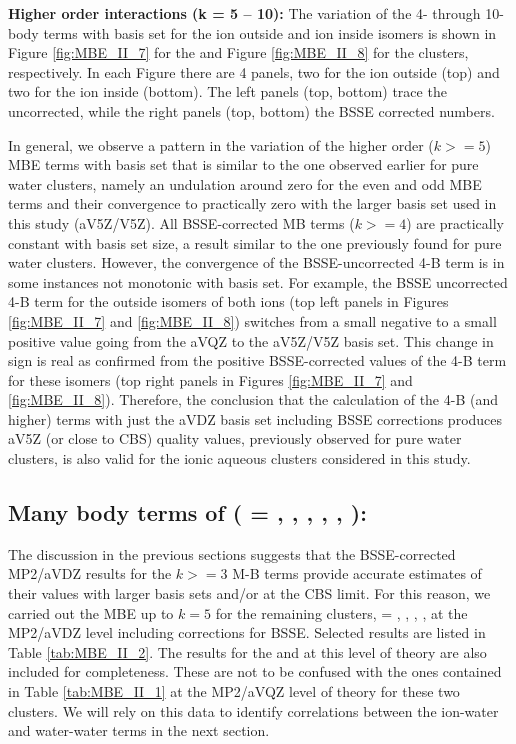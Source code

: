 \documentclass[11pt, proquest]{uwthesis}[2020/02/24]
\let\ce\ch
\begin{document}
\textbf{Higher order interactions (k = 5 – 10):} The variation of the 4- through 10-body terms with basis set for the ion outside and ion inside isomers is shown in Figure \ref{fig:MBE_II_7} for the \ce{Li^+(H2O)9} and Figure \ref{fig:MBE_II_8} for the \ce{Cl^-(H2O)9} clusters, respectively. In each Figure there are 4 panels, two for the ion outside (top) and two for the ion inside (bottom). The left panels (top, bottom) trace the uncorrected, while the right panels (top, bottom) the BSSE corrected numbers.

\par In general, we observe a pattern in the variation of the higher order ($k >= 5$) MBE terms with basis set that is similar to the one observed earlier for pure water clusters,\autocite{heindel_many-body_2020} namely an undulation around zero for the even and odd MBE terms and their convergence to practically zero with the larger basis set used in this study (aV5Z/V5Z). All BSSE-corrected MB terms ($k >= 4$) are practically constant with basis set size, a result similar to the one previously found for pure water clusters.\autocite{heindel_many-body_2020} However, the convergence of the BSSE-uncorrected 4-B term is in some instances not monotonic with basis set. For example, the BSSE uncorrected 4-B term for the outside isomers of both ions (top left panels in Figures \ref{fig:MBE_II_7} and \ref{fig:MBE_II_8}) switches from a small negative to a small positive value going from the aVQZ to the aV5Z/V5Z basis set. This change in sign is real as confirmed from the positive BSSE-corrected values of the 4-B term for these isomers (top right panels in Figures \ref{fig:MBE_II_7} and \ref{fig:MBE_II_8}). Therefore, the conclusion that the calculation of the 4-B (and higher) terms with just the aVDZ basis set including BSSE corrections produces aV5Z (or close to CBS) quality values, previously observed for pure water clusters,\autocite{heindel_many-body_2020} is also valid for the ionic aqueous clusters considered in this study.

\subsection{\textbf{Many body terms of \ce{Z^{+/-}(H2O)9} (\ce{Z} = \ce{Li}, \ce{K}, \ce{Cs}, \ce{Cl}, \ce{Br}, \ce{I}):}}

\par The discussion in the previous sections suggests that the BSSE-corrected MP2/aVDZ results for the $k >= 3$ M-B terms provide accurate estimates of their values with larger basis sets and/or at the CBS limit. For this reason, we carried out the MBE up to $k = 5$ for the remaining \ce{Z^{+/-}(H2O)9} clusters, \ce{Z} = \ce{K^+}, \ce{Cs^+}, \ce{Br^-}, \ce{I^-}, at the MP2/aVDZ level including corrections for BSSE. Selected results are listed in Table \ref{tab:MBE_II_2}. The results for the \ce{Li^+(H2O)9} and \ce{Cl^-(H2O)9} at this level of theory are also included for completeness. These are not to be confused with the ones contained in Table \ref{tab:MBE_II_1} at the MP2/aVQZ level of theory for these two clusters. We will rely on this data to identify correlations between the ion-water and water-water terms in the next section.
\end{document}

